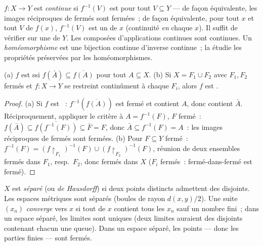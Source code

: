 \begin{definition}\label{def:b3:topology:continuity}
$f \colon X \to Y$ est \emph{continue}
si $f^{-1}(V)$ est  pour tout  $V \subseteq Y$ ---
de façon équivalente, les images réciproques de fermés sont
fermées~; de façon équivalente, pour tout $x$ et tout 
$V$ de $f(x)$, $f^{-1}(V)$ est un  de $x$ (continuité
\emph{en} chaque $x$). Il suffit de vérifier sur une  de
$Y$. Les composées d'applications continues sont continues. Un
\emph{homéomorphisme} est une bijection
continue d'inverse continue~; la  étudie les
propriétés préservées par les homéomorphismes.
\end{definition}

\begin{proposition}
\label{prop:b3:topology:gluing}
(a) $f$ est  ssi $f(\bar A) \subseteq \overline{f(A)}$
pour tout $A \subseteq X$.
(b) Si $X = F_1 \cup F_2$ avec $F_1, F_2$ fermés et $f\colon X
\to Y$ se restreint continûment à chaque $F_i$, alors $f$ est
.
\end{proposition}

\begin{proof}
(a) Si $f$ est ~: $f^{-1}(\overline{f(A)})$ est fermé et
contient $A$, donc contient $\bar A$. Réciproquement, appliquer
le critère à $A = f^{-1}(F)$, $F$ fermé~: $f(\bar A) \subseteq
\overline{f(f^{-1}(F))} \subseteq \bar F = F$, donc $\bar A
\subseteq f^{-1}(F) = A$~: les images réciproques de fermés
sont fermées.
(b) Pour $F \subseteq Y$ fermé~: $f^{-1}(F) =
(f\restriction_{F_1})^{-1}(F) \cup (f\restriction_{F_2})^{-1}
(F)$, réunion de deux ensembles fermés dans $F_1$, resp.\
$F_2$, donc fermés dans $X$ ($F_i$ fermés~: fermé-dans-fermé est
fermé).
\end{proof}

\begin{definition}\label{def:b3:topology:hausdorff}
$X$ est \emph{séparé} (ou \emph{de Hausdorff}) si deux points distincts
admettent des  disjoints. Les espaces métriques sont
séparés (boules de rayon $d(x,y)/2$). Une suite $(x_n)$
\emph{converge} vers $x$ si tout  de $x$ contient tous
les $x_n$ sauf un nombre fini~; dans un espace séparé, les
limites sont uniques (deux limites auraient des 
disjoints contenant chacun une queue). Dans un espace séparé,
les points --- donc les parties finies --- sont fermés.
\end{definition}

